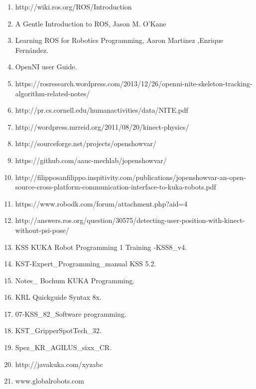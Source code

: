 \begin{enumerate}
	\item http://wiki.ros.org/ROS/Introduction
	\item A Gentle Introduction to ROS, Jason M. O’Kane
	\item Learning ROS for Robotics Programming, Aaron Martinez ,Enrique Fernández.
	\item OpenNI user Guide.
	\item https://rosresearch.wordpress.com/2013/12/26/openni-nite-skeleton-tracking-algorithm-related-notes/
	\item http://pr.cs.cornell.edu/humanactivities/data/NITE.pdf
	\item http://wordpress.mrreid.org/2011/08/20/kinect-physics/
	\item http://sourceforge.net/projects/openshowvar/
	\item https://github.com/aauc-mechlab/jopenshowvar/
	\item http://filipposanfilippo.inspitivity.com/publications/jopenshowvar-an-open-source-cross-platform-communication-interface-to-kuka-robots.pdf          
	\item https://www.robodk.com/forum/attachment.php?aid=4
	\item http://answers.ros.org/question/30575/detecting-user-position-with-kinect-without-psi-pose/ 
	\item KSS KUKA Robot Programming 1 Training -KSS8\_v4.
	\item KST-Expert\_Programming\_manual KSS 5.2.
	\item Notes\_ Bochum KUKA Programming.
	\item KRL Quickguide Syntax 8x.
	\item 07-KSS\_82\_Software programming.
	\item KST\_GripperSpotTech\_32.
	\item Spez\_KR\_AGILUS\_sixx\_CR.
	\item http://javakuka.com/xyzabc
	\item www.globalrobots.com
\end{enumerate}


%
